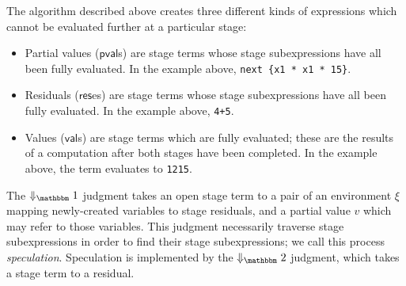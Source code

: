

\newcommand{\pval}{\ensuremath{\mathsf{pval}}}
\newcommand{\res}{\ensuremath{\mathsf{res}}}
\renewcommand{\val}{\ensuremath{\mathsf{val}}}

The algorithm described above creates three different kinds of expressions which
cannot be evaluated further at a particular stage:
\begin{itemize}
\item Partial values ($\pval$s) are stage \bbone{} terms whose stage \bbone{}
subexpressions have all been fully evaluated. In the example above,
\verb|next {x1 * x1 * 15}|.
\item Residuals ($\res$es) are stage \bbtwo{} terms whose stage \bbone{}
subexpressions have all been fully evaluated. In the example above,
\verb|4+5|.
\item Values ($\val$s) are stage \bbtwo{} terms which are fully evaluated; these
are the results of a computation after both stages have been completed. In the
example above, the term evaluates to \verb|1215|.
\end{itemize}
The $\redonesym$ judgment takes an open stage \bbone{} term to a pair of an
environment $\xi$ mapping newly-created variables to stage \bbtwo{} residuals,
and a partial value $v$ which may refer to those variables. This judgment
necessarily traverse stage \bbtwo{} subexpressions in order to find their stage
\bbone{} subexpressions; we call this process \emph{speculation}. Speculation is
implemented by the $\redtwosym$ judgment, which takes a stage \bbtwo{} term to a
residual.

